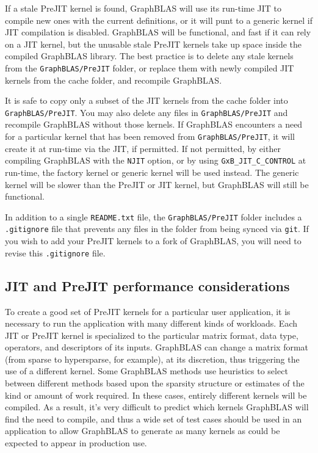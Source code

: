 \documentclass[12pt]{article}
\begin{document}
If a stale PreJIT kernel is found, GraphBLAS will use its run-time JIT to
compile new ones with the current definitions, or it will punt to a generic
kernel if JIT compilation is disabled.  GraphBLAS will be functional, and fast
if it can rely on a JIT kernel, but the unusable stale PreJIT kernels take up
space inside the compiled GraphBLAS library.  The best practice is to delete
any stale kernels from the \verb'GraphBLAS/PreJIT' folder, or replace them with
newly compiled JIT kernels from the cache folder, and recompile GraphBLAS.

It is safe to copy only a subset of the JIT kernels from the cache folder into
\verb'GraphBLAS/PreJIT'.  You may also delete any files in
\verb'GraphBLAS/PreJIT' and recompile GraphBLAS without those kernels.  If
GraphBLAS encounters a need for a particular kernel that has been removed from
\verb'GraphBLAS/PreJIT', it will create it at run-time via the JIT, if
permitted.  If not permitted, by either compiling GraphBLAS with the
\verb'NJIT' option, or by using \verb'GxB_JIT_C_CONTROL' at run-time, the
factory kernel or generic kernel will be used instead.  The generic kernel will
be slower than the PreJIT or JIT kernel, but GraphBLAS will still be
functional.

In addition to a single \verb'README.txt' file, the \verb'GraphBLAS/PreJIT'
folder includes a \verb'.gitignore' file that prevents any files in the folder
from being synced via \verb'git'.  If you wish to add your PreJIT kernels to a
fork of GraphBLAS, you will need to revise this \verb'.gitignore' file.

\subsection{{\sf JIT} and {\sf PreJIT} performance considerations}
\label{jit_performance}

To create a good set of PreJIT kernels for a particular user application, it is
necessary to run the application with many different kinds of workloads.  Each
JIT or PreJIT kernel is specialized to the particular matrix format, data type,
operators, and descriptors of its inputs.  GraphBLAS can change a matrix format
(from sparse to hypersparse, for example), at its discretion, thus triggering
the use of a different kernel.  Some GraphBLAS methods use heuristics to select
between different methods based upon the sparsity structure or estimates of the
kind or amount of work required.  In these cases, entirely different kernels
will be compiled.  As a result, it's very difficult to predict which kernels
GraphBLAS will find the need to compile, and thus a wide set of test cases
should be used in an application to allow GraphBLAS to generate as many kernels
as could be expected to appear in production use.
\end{document}
